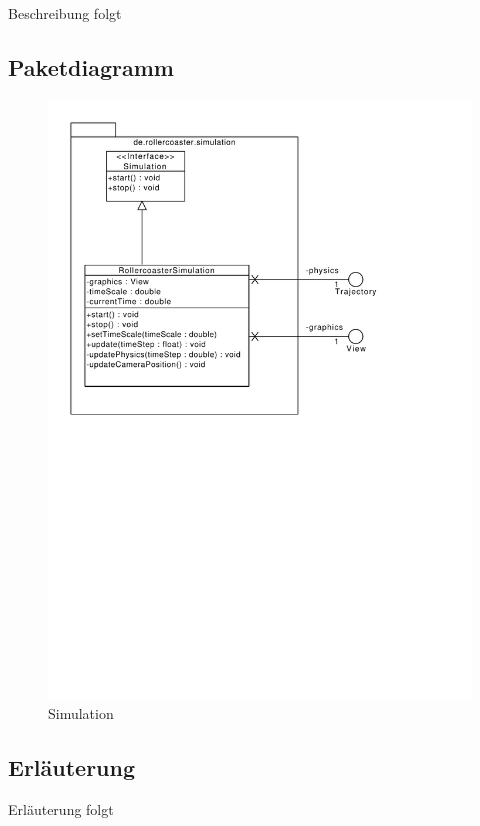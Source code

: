 Beschreibung folgt

\subsection{Paketdiagramm}
\begin{figure}
\includegraphics[width=\linewidth]{bilder/Simulation}
\caption{Simulation}
\end{figure}

\subsection{Erläuterung}

Erläuterung folgt
